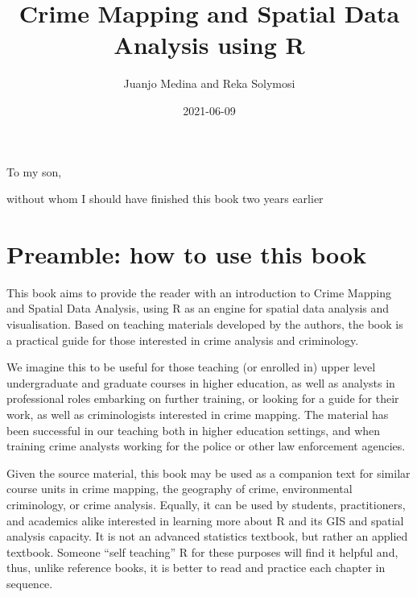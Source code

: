 \documentclass[
]{book}
\title{Crime Mapping and Spatial Data Analysis using R}
\author{Juanjo Medina and Reka Solymosi}
\date{2021-06-09}
\begin{document}
\maketitle


\thispagestyle{empty}

\begin{center}
To my son,

without whom I should have finished this book two years earlier
\end{center}

\setlength{\abovedisplayskip}{-5pt}
\setlength{\abovedisplayshortskip}{-5pt}

{
\setcounter{tocdepth}{2}
\tableofcontents
}
\hypertarget{preamble-how-to-use-this-book}{%
\chapter{Preamble: how to use this book}\label{preamble-how-to-use-this-book}}

This book aims to provide the reader with an introduction to Crime Mapping and Spatial Data Analysis, using R as an engine for spatial data analysis and visualisation. Based on teaching materials developed by the authors, the book is a practical guide for those interested in crime analysis and criminology.

We imagine this to be useful for those teaching (or enrolled in) upper level undergraduate and graduate courses in higher education, as well as analysts in professional roles embarking on further training, or looking for a guide for their work, as well as criminologists interested in crime mapping. The material has been successful in our teaching both in higher education settings, and when training crime analysts working for the police or other law enforcement agencies.

Given the source material, this book may be used as a companion text for similar course units in crime mapping, the geography of crime, environmental criminology, or crime analysis. Equally, it can be used by students, practitioners, and academics alike interested in learning more about R and its GIS and spatial analysis capacity. It is not an advanced statistics textbook, but rather an applied textbook. Someone ``self teaching'' R for these purposes will find it helpful and, thus, unlike reference books, it is better to read and practice each chapter in sequence.
\end{document}
